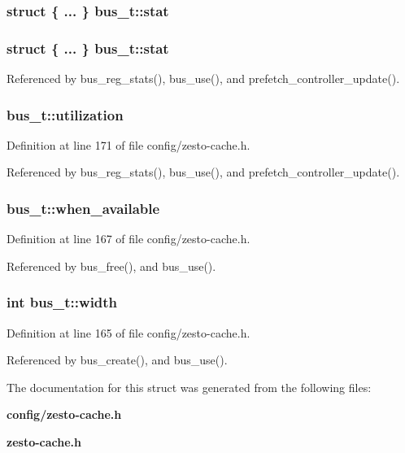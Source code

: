 \subsubsection[{stat}]{\setlength{\rightskip}{0pt plus 5cm}struct \{ ... \}   {\bf bus\_\-t::stat}}\label{structbus__t_4fb7bf8a2aba9f1675422c244996bebe}


\subsubsection[{stat}]{\setlength{\rightskip}{0pt plus 5cm}struct \{ ... \}   {\bf bus\_\-t::stat}}\label{structbus__t_1f697d65f6c66e279093e976b130564e}




Referenced by bus\_\-reg\_\-stats(), bus\_\-use(), and prefetch\_\-controller\_\-update().
\subsubsection[{utilization}]{ {\bf bus\_\-t::utilization}}\label{structbus__t_5e3ae58910e4ccff614a344b9feafd84}




Definition at line 171 of file config/zesto-cache.h.

Referenced by bus\_\-reg\_\-stats(), bus\_\-use(), and prefetch\_\-controller\_\-update().
\subsubsection[{when\_\-available}]{ {\bf bus\_\-t::when\_\-available}}\label{structbus__t_5edbe428ec622cd0dd0b3bf9f638489d}




Definition at line 167 of file config/zesto-cache.h.

Referenced by bus\_\-free(), and bus\_\-use().
\subsubsection[{width}]{\setlength{\rightskip}{0pt plus 5cm}int {\bf bus\_\-t::width}}\label{structbus__t_163295a076e9d822767f09cb100115db}




Definition at line 165 of file config/zesto-cache.h.

Referenced by bus\_\-create(), and bus\_\-use().

The documentation for this struct was generated from the following files:\begin{CompactItemize}
\item 
{\bf config/zesto-cache.h}\item 
{\bf zesto-cache.h}\end{CompactItemize}
